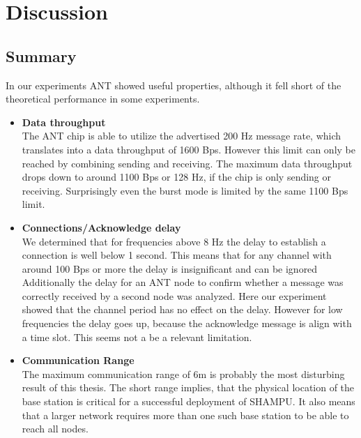 \chapter{Discussion}
\section{Summary}


In our experiments ANT showed useful properties, although it fell short of the theoretical performance in some experiments.

\begin{itemize}
	\item{\textbf{Data throughput}} \hfill \\ 
	The ANT chip is able to utilize the advertised 200 Hz message rate, which translates into a data throughput of 1600 Bps. However this limit can only be reached by combining sending and receiving. The maximum data throughput drops down to around 1100 Bps or 128 Hz, if the chip is only sending or receiving. Surprisingly even the burst mode is limited by the same 1100 Bps limit.
	
	\item{\textbf{Connections/Acknowledge delay}} \hfill \\ 
	We determined that for frequencies above 8 Hz the delay to establish a connection is well below 1 second. This means that for any channel with around 100 Bps or more the delay is insignificant and can be ignored
	Additionally the delay for an ANT node to confirm whether a message was correctly received by a second node was analyzed. Here our experiment showed that the channel period has no effect on the delay. However for low frequencies the delay goes up, because the acknowledge message is align with a time slot. This seems not a be a relevant limitation.
	
	\item{\textbf{Communication Range}} \hfill \\ The maximum communication range of 6m is probably the most disturbing result of this thesis. The short range implies, that the physical location of the base station is critical for a successful deployment of SHAMPU. It also means that a larger network requires more than one such base station to be able to reach all nodes. 
\end{itemize}


